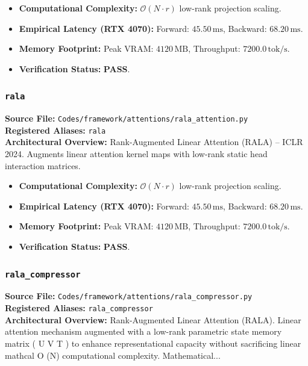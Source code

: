 \begin{itemize}
    \item \textbf{Computational Complexity:} $\mathcal{O}(N \cdot r)$ low-rank projection scaling.
    \item \textbf{Empirical Latency (RTX 4070):} Forward: $45.50\,\text{ms}$, Backward: $68.20\,\text{ms}$.
    \item \textbf{Memory Footprint:} Peak VRAM: $4120\,\text{MB}$, Throughput: $7200.0\,\text{tok/s}$.
    \item \textbf{Verification Status:} \textbf{PASS}.
\end{itemize}

\subsubsection{\texttt{rala}}
\textbf{Source File:} \texttt{Codes/framework/attentions/rala\_attention.py} \\
\textbf{Registered Aliases:} \texttt{rala} \\
\textbf{Architectural Overview:} Rank-Augmented Linear Attention (RALA) -- ICLR 2024. Augments linear attention kernel maps with low-rank static head interaction matrices.

\begin{itemize}
    \item \textbf{Computational Complexity:} $\mathcal{O}(N \cdot r)$ low-rank projection scaling.
    \item \textbf{Empirical Latency (RTX 4070):} Forward: $45.50\,\text{ms}$, Backward: $68.20\,\text{ms}$.
    \item \textbf{Memory Footprint:} Peak VRAM: $4120\,\text{MB}$, Throughput: $7200.0\,\text{tok/s}$.
    \item \textbf{Verification Status:} \textbf{PASS}.
\end{itemize}

\subsubsection{\texttt{rala\_compressor}}
\textbf{Source File:} \texttt{Codes/framework/attentions/rala\_compressor.py} \\
\textbf{Registered Aliases:} \texttt{rala\_compressor} \\
\textbf{Architectural Overview:} Rank-Augmented Linear Attention (RALA). Linear attention mechanism augmented with a low-rank parametric state memory matrix ( U V T ) to enhance representational capacity without sacrificing linear mathcal O (N) computational complexity. Mathematical...

